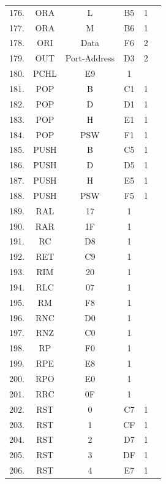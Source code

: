 \documentclass{scrreprt}
\begin{document}
\begin{longtable}{|c|c|c|c|c|c|}
176. & ORA  & L            & B5   & 1  &   \\
177. & ORA  & M            & B6   & 1  &   \\
178. & ORI  & Data         & F6   & 2  &   \\
179. & OUT  & Port-Address & D3   & 2  &   \\
180. & PCHL & E9           & 1    &    &   \\
181. & POP  & B            & C1   & 1  &   \\
182. & POP  & D            & D1   & 1  &   \\
183. & POP  & H            & E1   & 1  &   \\
184. & POP  & PSW          & F1   & 1  &   \\
185. & PUSH & B            & C5   & 1  &   \\
186. & PUSH & D            & D5   & 1  &   \\
187. & PUSH & H            & E5   & 1  &   \\
188. & PUSH & PSW          & F5   & 1  &   \\
189. & RAL  & 17           & 1    &    &   \\
190. & RAR  & 1F           & 1    &    &   \\
191. & RC   & D8           & 1    &    &   \\
192. & RET  & C9           & 1    &    &   \\
193. & RIM  & 20           & 1    &    &   \\
194. & RLC  & 07           & 1    &    &   \\
195. & RM   & F8           & 1    &    &   \\
196. & RNC  & D0           & 1    &    &   \\
197. & RNZ  & C0           & 1    &    &   \\
198. & RP   & F0           & 1    &    &   \\
199. & RPE  & E8           & 1    &    &   \\
200. & RPO  & E0           & 1    &    &   \\
201. & RRC  & 0F           & 1    &    &   \\
202. & RST  & 0            & C7   & 1  &   \\
203. & RST  & 1            & CF   & 1  &   \\
204. & RST  & 2            & D7   & 1  &   \\
205. & RST  & 3            & DF   & 1  &   \\
206. & RST  & 4            & E7   & 1  &   \\

\end{longtable}
\end{document}
